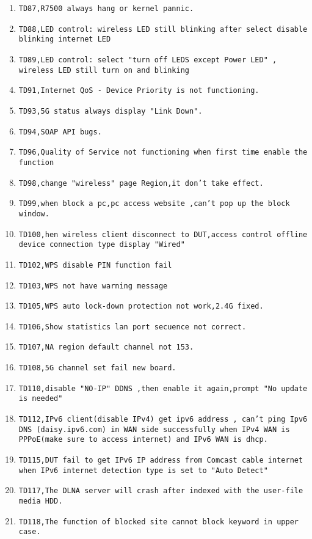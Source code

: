 \documentclass[12pt]{report}
\begin{document}
\begin{itemize}
\begin{enumerate}
		\item \texttt{TD87,R7500 always hang or kernel pannic.}
		\item \texttt{TD88,LED control: wireless LED still blinking after select disable blinking internet LED}
		\item \texttt{TD89,LED control: select "turn off LEDS except Power LED" , wireless LED still turn on and blinking}
		\item \texttt{TD91,Internet QoS - Device Priority is not functioning.}
		\item \texttt{TD93,5G status always display "Link Down".}
		\item \texttt{TD94,SOAP API bugs.}
		\item \texttt{TD96,Quality of Service not functioning when first time enable the function}
		\item \texttt{TD98,change "wireless" page Region,it don't take effect.}
		\item \texttt{TD99,when block a pc,pc access website ,can't pop up the block window.}
		\item \texttt{TD100,hen wireless client disconnect to DUT,access control offline device connection type display "Wired"}
		\item \texttt{TD102,WPS disable PIN function fail}
		\item \texttt{TD103,WPS not have warning message}
		\item \texttt{TD105,WPS auto lock-down protection not work,2.4G fixed.}
		\item \texttt{TD106,Show statistics lan port secuence not correct.}
		\item \texttt{TD107,NA region default channel not 153.}
		\item \texttt{TD108,5G channel set fail new board.}
		\item \texttt{TD110,disable "NO-IP" DDNS ,then enable it again,prompt "No update is needed"}
		\item \texttt{TD112,IPv6 client(disable IPv4) get ipv6 address , can't ping Ipv6 DNS (daisy.ipv6.com) in WAN side successfully when IPv4 WAN is PPPoE(make sure to access internet) and IPv6 WAN is dhcp.}
		\item \texttt{TD115,DUT fail to get IPv6 IP address from Comcast cable internet when IPv6 internet detection type is set to "Auto Detect"}
		\item \texttt{TD117,The DLNA server will crash after indexed with the user-file media HDD.}
		\item \texttt{TD118,The function of blocked site cannot block keyword in upper case.}

\end{enumerate}
\end{itemize}
\end{document}
